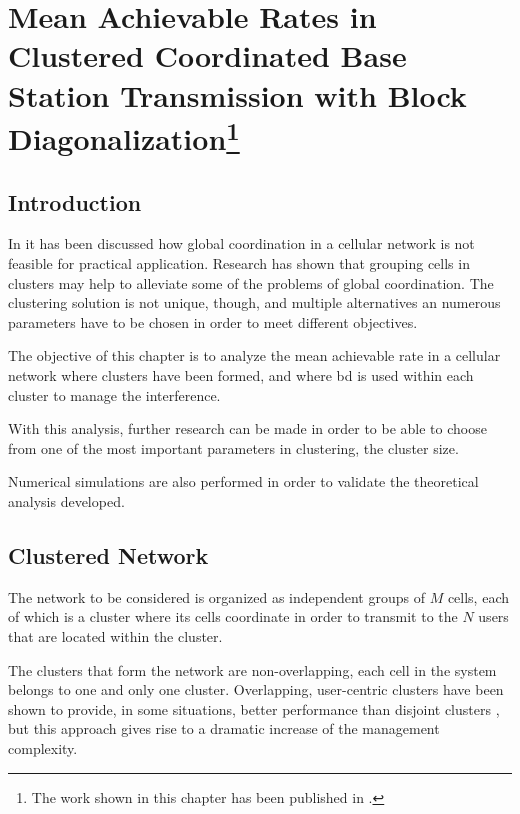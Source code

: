 \chapter[Achievable Rates]{Mean Achievable Rates in Clustered Coordinated Base
Station Transmission with Block Diagonalization\footnote{
    The work shown in this chapter has been published in \cite{corvaja13b}.
}} \label{ch:achiev_rates}

\section{Introduction}\label{sec:achiev_introduction}

In  it has been discussed how global coordination in a
cellular network is not feasible for practical application. Research has shown
that grouping cells in clusters may help to alleviate some of the problems of
global coordination. The clustering solution is not unique, though, and multiple
alternatives an numerous parameters have to be chosen in order to meet different
objectives.

The objective of this chapter is to analyze the mean achievable rate in a cellular network where clusters have been formed, and where \gls{bd} is used within
each cluster to manage the interference. 

With this analysis, further research can be made in order to be able to choose
from one of the most important parameters in clustering, the cluster size.

Numerical simulations are also performed in order to validate the theoretical
analysis developed.

\section{Clustered Network}\label{sec:achiev_clust_net}

The network to be considered is organized as independent groups of $M$ cells,
each of which is a cluster where its cells coordinate in order to transmit to
the $N$ users that are located within the cluster.

The clusters that form the network are non-overlapping, \ie each cell in
the system belongs to one and only one cluster. Overlapping, user-centric
clusters have been shown to provide, in some situations, better performance than
disjoint clusters \cite{bjornson11}, but this approach gives rise to a dramatic
increase of the management complexity.

